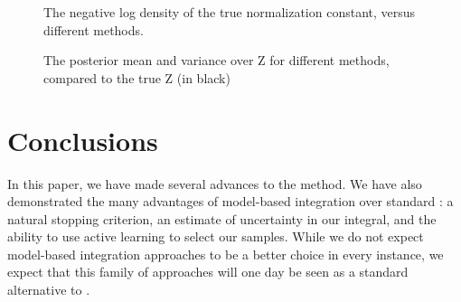 \documentclass{article}
\begin{document}
% 
% 
% 
% 

\begin{figure}
	\caption{The negative log density of the true normalization constant, versus different methods.}
\end{figure}

\begin{figure}
	\centering
	\caption{The posterior mean and variance over Z for different methods, compared to the true Z (in black)}
\end{figure}





\section{Conclusions}

 In this paper, we have made several advances to the  method.  We have also demonstrated the many advantages of model-based integration over standard : a natural stopping criterion, an estimate of uncertainty in our integral, and the ability to use active learning to select our samples. 
While we do not expect model-based integration approaches to be a better choice in every instance, we expect that this family of approaches will one day be seen as a standard alternative to .
\end{document}
